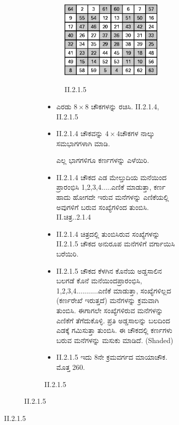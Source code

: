 \begin{figure}[H]
\begin{figure}[H]
\begin{figure}[h]
\begin{figure}[h]
\includegraphics{src/figures/chap3/fig3-18.eps}\\
\caption*{II.2.1.5}
\end{figure}

\begin{itemize}
	\item ಎರಡು $8 \times 8$ ಚೌಕಗಳನ್ನು ರಚಿಸಿ. II.2.1.4, II.2.1.5
	\item II.2.1.4 ಚೌಕವನ್ನು $4 \times 4$ಚೌಕಗಳ ನಾಲ್ಕು ಸಮಭಾಗಗಳಾಗಿ ಮಾಡಿ.

	ಎಲ್ಲ ಭಾಗಗಳಿಗೂ ಕರ್ಣಗಳನ್ನು ಎಳೆಯಿರಿ.
	\item II.2.1.4 ಚೌಕದ ಎಡ ಮೇಲ್ತುದಿಯ ಮನೆಯಿಂದ ಪ್ರಾರಂಭಿಸಿ 1,2,3,4.....ಎಣಿಕೆ ಮಾಡುತ್ತಾ, ಕರ್ಣ ಹಾದು ಹೋಗದೇ ಇರುವ ಮನೆಗಳನ್ನು ಎಣಿಕೆಯಲ್ಲಿ ಅವುಗಳಿಗೆ ಬರುವ ಸಂಖ್ಯೆಗಳಿಂದ ತುಂಬಿಸಿ. II.ಚಿತ್ರ..2.1.4
	\item II.2.1.4 ಚಿತ್ರದಲ್ಲಿ ತುಂಬಿಸಿರುವ ಸಂಖ್ಯೆಗಳನ್ನು II.2.1.5 ಚೌಕದ ಅನುರೂಪ ಮನೆಗಳಿಗೆ ವರ್ಗಾಯಿಸಿ ಬರೆಯಿರಿ.
	\item II.2.1.5 ಚೌಕದ ಕೆಳಗಿನ ಕೊನೆಯ ಅಡ್ಡಸಾಲಿನ ಬಲಗಡೆ ಕೊನೆ ಮನೆಯಿಂದ\break ಪ್ರಾರಂಭಿಸಿ, 1,2,3,4...........ಎಣಿಕೆ ಮಾಡುತ್ತಾ, ಸಂಖ್ಯೆಗಳಿಲ್ಲದ (ಕರ್ಣರೇಖೆ ಇರುತ್ತದೆ) ಮನೆಗಳನ್ನು ಕ್ರಮವಾಗಿ ತುಂಬಿಸಿ. ಈಗಾಗಲೇ ಸಂಖ್ಯೆಗಳಿರುವ ಮನೆ\-ಗಳನ್ನು ಎಣಿಕೆಗೆ ತೆಗೆದುಕೊಳ್ಳಿ. ಪ್ರತಿ ಅಡ್ಡಸಾಲನ್ನು ಬಲದಿಂದ ಎಡಕ್ಕೆ ಗಮಿಸುತ್ತಾ ತುಂಬಿಸಿ. ಈ ಚೌಕದಲ್ಲಿ ಕರ್ಣಗಳು ಬರುವ ಮನೆಗಳನ್ನು ಮಸುಕು ಮಾಡಿದೆ. (Shaded)
	\item II.2.1.5 ಇದು 8ನೇ ಕ್ರಮವರ್ಗದ ಮಾಯಾಚೌಕ. ಮೊತ್ತ 260.


\end{itemize}
\end{figure}
\end{figure}
\end{figure}
